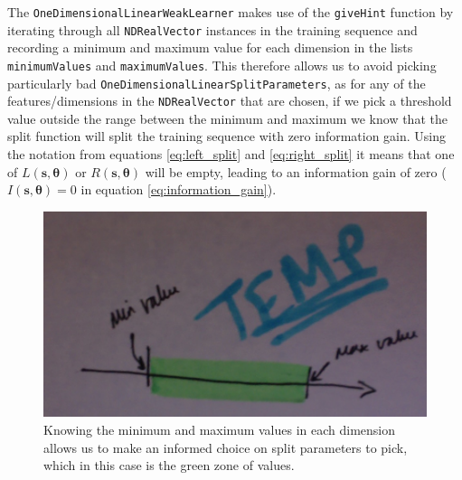 \documentclass[12pt,twoside,notitlepage]{report}
\newcommand{\vc}[1]{\mathbf{#1}}
\begin{document}
                The \texttt{OneDimensionalLinearWeakLearner} makes use of the \texttt{giveHint} function by iterating through 
                all \texttt{NDRealVector} instances in the training sequence and recording a minimum and maximum value 
                for each dimension in the lists \texttt{minimumValues} and \texttt{maximumValues}. This therefore 
                allows us to avoid picking particularly bad \texttt{OneDimensionalLinearSplitParameters}, 
                as for any of the features/dimensions in the \texttt{NDRealVector} 
                that are chosen, if we pick a threshold value outside the range between the minimum and maximum we know that 
                the split function will split the training sequence with zero information gain. Using the notation from 
                equations \ref{eq:left_split} and \ref{eq:right_split} it means that one of $L(\vc{s},\vc{\theta})$ or 
                $R(\vc{s},\vc{\theta})$ will be empty, leading to an information gain of zero ($I(\vc{s},\vc{\theta}) = 0$ 
                in equation \ref{eq:information_gain}).

                \begin{figure}[H]
                  \centering
                  \includegraphics[scale=0.25]{one_dimensional_weak_learner_optimisation.jpeg}
                  \caption{Knowing the minimum and maximum values in each dimension allows us to make an informed 
                  choice on split parameters to pick, which in this case is the green zone of values.}
                \end{figure}
\end{document}

